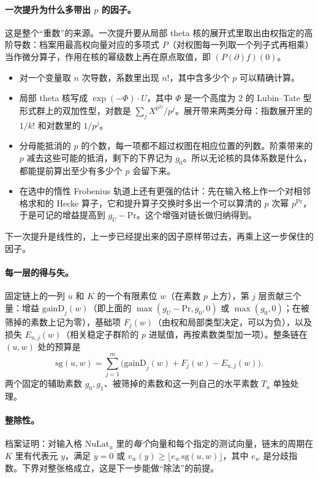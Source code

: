 \documentclass[11pt]{article}
\begin{document}
\paragraph{一次提升为什么多带出 $p$ 的因子。} 这是整个“重数”的来源。一次提升要从局部 theta 核的展开式里取出由权指定的高阶导数：档案用最高权向量对应的多项式 $P$（对权图每一列取一个列子式再相乘）当作微分算子，作用在核的幂级数上再在原点取值，即 $(P(\partial)f)(0)$。
\begin{itemize}
\item 对一个变量取 $n$ 次导数，系数里出现 $n!$，其中含多少个 $p$ 可以精确计算。
\item 局部 theta 核写成 $\exp(-\Phi)\cdot U$，其中 $\Phi$ 是一个高度为 $2$ 的 Lubin–Tate 型形式群上的双加性型，对数是 $\sum_j X^{p^{2j}}/p^j$。展开带来两类分母：指数展开里的 $1/k!$ 和对数里的 $1/p^j$。
\item 分母能抵消的 $p$ 的个数，每一项都不超过权图在相应位置的列数。阶乘带来的 $p$ 减去这些可能的抵消，剩下的下界记为 $g_0$。所以无论核的具体系数是什么，都能提前算出至少有多少个 $p$ 会留下来。
\item 在选中的惰性 Frobenius 轨道上还有更强的估计：先在输入格上作一个对相邻格求和的 Hecke 算子，它和提升算子交换时多出一个可以算清的 $p$ 次幂 $p^{\mathrm{Pr}}$，于是可记的增益提高到 $g_U-\mathrm{Pr}$。这个增强对链长做归纳得到。
\end{itemize}
下一次提升是线性的，上一步已经提出来的因子原样带过去，再乘上这一步保住的因子。

\paragraph{每一层的得与失。} 固定链上的一列 $u$ 和 $K$ 的一个有限素位 $w$（在素数 $p$ 上方），第 $j$ 层贡献三个量：增益 $\mathrm{gainD}_j(w)$（即上面的 $\max(g_U-\mathrm{Pr},g_0,0)$ 或 $\max(g_0,0)$；在被筛掉的素数上记为零），基础项 $F_j(w)$（由权和局部类型决定，可以为负），以及损失 $E_{u,j}(w)$（相关稳定子群阶的 $p$ 进赋值，再按素数类型加一项）。整条链在 $(u,w)$ 处的预算是
\[
\mathrm{sg}(u,w)=\sum_{j=1}^{m}\bigl(\mathrm{gainD}_j(w)+F_j(w)-E_{u,j}(w)\bigr).
\]
两个固定的辅助素数 $g_0,g_1$、被筛掉的素数和这一列自己的水平素数 $T_u$ 单独处理。

\paragraph{整除性。} 档案证明：对输入格 $\mathrm{NuLat}_u$ 里的\emph{每个}向量和每个指定的测试向量，链末的周期在 $K$ 里有代表元 $y$，满足 $y=0$ 或 $v_w(y)\ge\lfloor e_w\,\mathrm{sg}(u,w)\rfloor$，其中 $e_w$ 是分歧指数。下界对整张格成立，这是下一步能做“除法”的前提。
\end{document}
